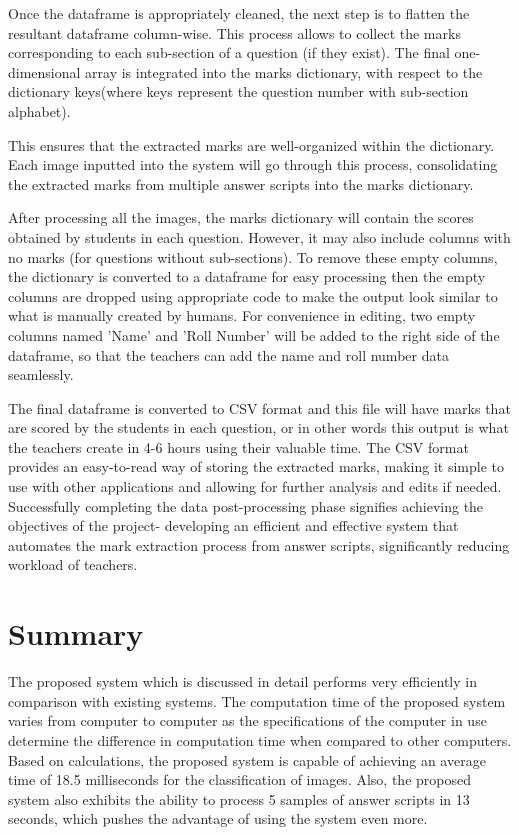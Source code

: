 \noindent Once the dataframe is appropriately cleaned, the next step is to flatten the resultant dataframe column-wise. This process allows to collect the marks corresponding to each sub-section of a question (if they exist). The final one-dimensional array is integrated into the marks dictionary, with respect to the dictionary keys(where keys represent the question number with sub-section alphabet).

\clearpage

\noindent This ensures that the extracted marks are well-organized within the dictionary. Each image inputted into the system will go through this process, consolidating the extracted marks from multiple answer scripts into the marks dictionary.

\noindent After processing all the images, the marks dictionary will contain the scores obtained by students in each question. However, it may also include columns with no marks (for questions without sub-sections). To remove these empty columns, the dictionary is converted to a dataframe for easy processing then the empty columns are dropped using appropriate code to make the output look similar to what is manually created by humans. For convenience in editing, two empty columns named 'Name' and 'Roll Number' will be added to the right side of the dataframe, so that the teachers can add the name and roll number data seamlessly.

\noindent The final dataframe is converted to CSV format and this file will have marks that are scored by the students in each question, or in other words this output is what the teachers create in 4-6 hours using their valuable time. The CSV format provides an easy-to-read way of storing the extracted marks, making it simple to use with other applications and allowing for further analysis and edits if needed. Successfully completing the data post-processing phase signifies achieving the objectives of the project- developing an efficient and effective system that automates the mark extraction process from answer scripts, significantly reducing workload of teachers.

\section{Summary}


\noindent
The proposed system which is discussed in detail performs very efficiently in comparison with existing systems. The computation time of the proposed system varies from computer to computer as the specifications of the computer in use determine the difference in computation time when compared to other computers. Based on calculations, the proposed system is capable of achieving an average time of 18.5 milliseconds for the classification of images. Also, the proposed system also exhibits the ability to process 5 samples of answer scripts in 13 seconds, which pushes the advantage of using the system even more.
